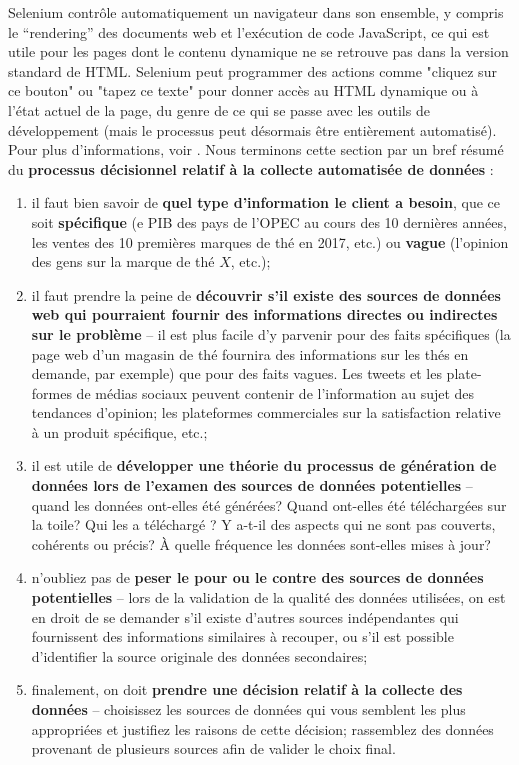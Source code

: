 Selenium contrôle automatiquement un navigateur dans son ensemble, y compris le ``rendering'' des documents web et l'exécution de code JavaScript, ce qui est utile pour les pages dont le contenu dynamique ne se retrouve pas dans la version standard de HTML. Selenium peut programmer des actions comme "cliquez sur ce bouton" ou "tapez ce texte" pour donner accès au HTML dynamique ou à l'état actuel de la page, du genre de ce qui se passe avec les outils de développement (mais le processus peut désormais être entièrement automatisé). Pour plus d'informations, voir \cite{DC_S,DC_S2}.
\newl 
Nous terminons cette section par un bref résumé du \textbf{processus décisionnel relatif à la collecte automatisée de données} \cite{DC_MRMN,DC_M}: 
\begin{enumerate}
    \item il faut bien savoir de \textbf{quel type d'information le client a besoin}, que ce soit \textbf{spécifique} (e PIB des pays de l'OPEC au cours des 10 dernières années, les ventes des 10 premières marques de thé en 2017, etc.) ou \textbf{vague} (l'opinion des gens sur la marque de thé $X$, etc.);
\item il faut prendre la peine de \textbf{découvrir s'il existe des sources de données web qui pourraient fournir des informations directes ou indirectes sur le problème}  -- il est plus facile d'y parvenir pour des faits spécifiques (la page web d'un magasin de thé fournira des informations sur les thés en demande, par exemple) que pour des faits vagues. Les tweets et les plate-formes de médias sociaux peuvent contenir de l’information au sujet des tendances d'opinion; les plateformes commerciales  sur la satisfaction relative à un produit spécifique, etc.;
\item il est utile de \textbf{développer une théorie du processus de génération de données lors de l'examen des sources de données potentielles}  -- quand les données ont-elles été générées? Quand ont-elles été téléchargées sur la toile? Qui les a téléchargé ? Y a-t-il des aspects qui ne sont pas couverts, cohérents ou précis? À quelle fréquence les données sont-elles mises à jour?
\item n'oubliez pas de \textbf{peser le pour ou le contre des sources de données potentielles}  -- lors de la validation de la qualité des données utilisées, on est en droit de se demander s’il existe d'autres sources indépendantes qui fournissent des informations similaires à recouper, ou s’il est possible d’identifier la source originale des données secondaires;
\item finalement, on doit \textbf{prendre une décision relatif à la collecte des données}  --  choisissez les sources de données qui vous semblent les plus appropriées et justifiez les raisons de cette décision; rassemblez des données provenant de plusieurs sources afin de valider le choix final. 
\end{enumerate}
